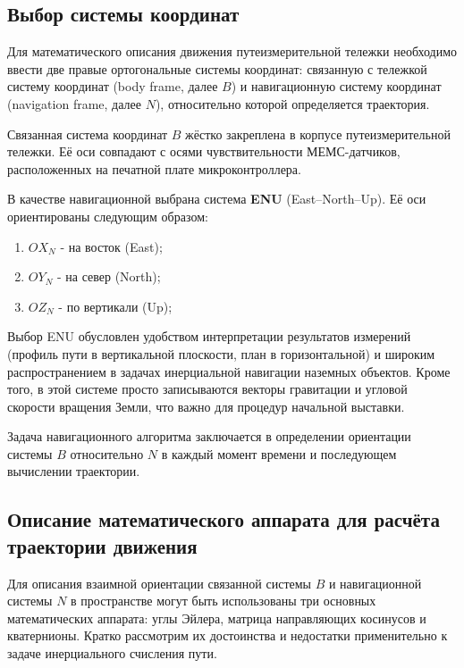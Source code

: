 
\subsection{Выбор системы координат}

Для математического описания движения путеизмерительной тележки необходимо ввести две правые ортогональные системы координат: связанную с тележкой систему координат (body frame, далее $B$) и навигационную систему координат (navigation frame, далее $N$), относительно которой определяется траектория.

Связанная система координат $B$ жёстко закреплена в корпусе путеизмерительной тележки. Её оси совпадают с осями чувствительности МЕМС-датчиков, расположенных на печатной плате микроконтроллера.

В качестве навигационной выбрана система \textbf{ENU} (East–North–Up). Её оси ориентированы следующим образом:
\begin{enumerate}
	\item $OX_{N}$ - на восток (East);
	\item $OY_{N}$ - на север (North);
	\item $OZ_{N}$ - по вертикали (Up);
\end{enumerate}

Выбор ENU обусловлен удобством интерпретации результатов измерений (профиль пути в вертикальной плоскости, план в горизонтальной) и широким распространением в задачах инерциальной навигации наземных объектов. Кроме того, в этой системе просто записываются векторы гравитации и угловой скорости вращения Земли, что важно для процедур начальной выставки.

Задача навигационного алгоритма заключается в определении ориентации системы $B$ относительно $N$ в каждый момент времени и последующем вычислении траектории.


\subsection{Описание математического аппарата для расчёта траектории движения}

Для описания взаимной ориентации связанной системы $B$ и навигационной системы $N$ в пространстве могут быть использованы три основных математических аппарата: углы Эйлера, матрица направляющих косинусов и кватернионы. Кратко рассмотрим их достоинства и недостатки применительно к задаче инерциального счисления пути.

